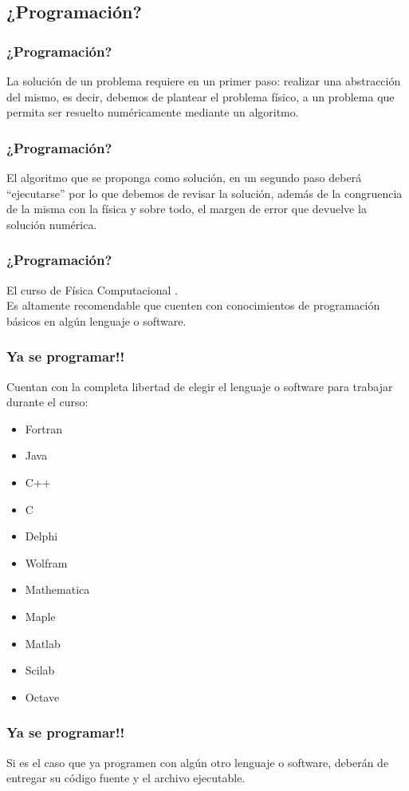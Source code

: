 \subsection{¿Programación?}
\begin{frame}
\frametitle{¿Programación?}
La solución de un problema requiere en un primer paso:  realizar una abstracción del mismo, es decir, debemos de plantear el problema físico, a un problema que permita ser resuelto numéricamente mediante un algoritmo.
\end{frame}
\begin{frame}
\frametitle{¿Programación?}
El algoritmo que se proponga como solución, en un segundo paso deberá \enquote{ejecutarse} por lo que debemos de revisar la solución, además de la congruencia de la misma con la física y sobre todo, el margen de error que devuelve la solución numérica.
\end{frame}
\begin{frame}
\frametitle{¿Programación?}
El curso de Física Computacional .
\\
\bigskip
Es altamente recomendable que cuenten con conocimientos de programación básicos en algún lenguaje o software.
\end{frame}
\begin{frame}
\frametitle{Ya se programar!!}
Cuentan con la completa libertad de elegir el lenguaje o software para trabajar durante el curso:
\begin{multicols}{2}
\begin{itemize}
\item Fortran
\item Java
\item C++
\item C
\item Delphi
\item Wolfram
\item Mathematica
\item Maple
\item Matlab
\item Scilab
\item Octave
\end{itemize}
\end{multicols}
\end{frame}
\begin{frame}
\frametitle{Ya se programar!!}
Si es el caso que ya programen con algún otro lenguaje o software, deberán de entregar su código fuente y el archivo ejecutable.
\end{frame}
